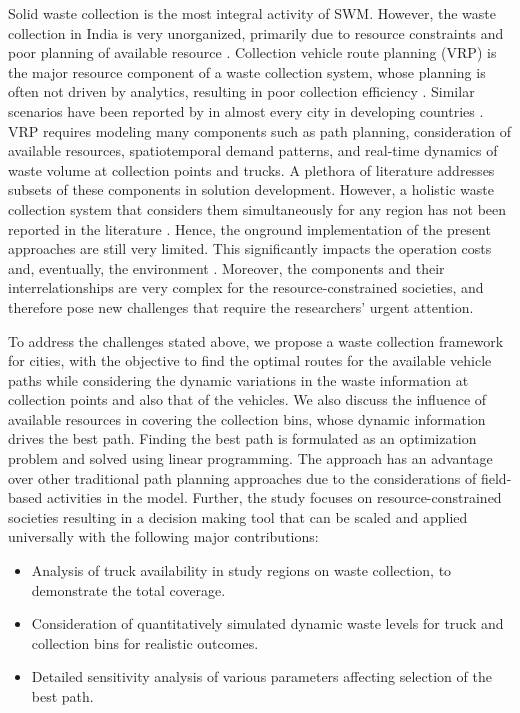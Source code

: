 \documentclass[12pt]{article}
\begin{document}
Solid waste collection is the most integral activity of SWM. However, the waste collection in India is very unorganized, primarily due to resource constraints and poor planning of available resource \cite{somani2021integrated,GUPTA2015206}. Collection vehicle route planning (VRP) is the major resource component of a waste collection system, whose planning is often not driven by analytics, resulting in poor collection efficiency \cite{akbarpour2021innovative}. Similar scenarios have been reported by in almost every city in developing countries \cite{GUPTA2015206}. VRP requires modeling many components such as path planning, consideration of available resources, spatiotemporal demand patterns, and real-time dynamics of waste volume at collection points and trucks. A plethora of literature addresses subsets of these components in solution development. However, a holistic waste collection system that considers them simultaneously for any region has not been reported in the literature \cite{han2015waste}. Hence, the onground implementation of the present approaches are still very limited. This significantly impacts the operation costs and, eventually, the environment \cite{apaydin2007route}. Moreover, the components and their interrelationships are very complex for the resource-constrained societies, and therefore pose new challenges that require the researchers' urgent attention.

To address the challenges stated above, we propose a waste collection framework for cities, with the objective to find the optimal routes for the available vehicle paths while considering the dynamic variations in the waste information at collection points and also that of the vehicles. We also discuss the influence of available resources in covering the collection bins, whose dynamic information drives the best path. Finding the best path is formulated as an optimization problem and solved using linear programming. The approach has an advantage over other traditional path planning approaches due to the considerations of field-based activities in the model. Further, the study  focuses on resource-constrained societies resulting in a decision making tool that can be scaled and applied universally with the following major contributions:

\begin{itemize}
\item Analysis of truck availability in study regions on waste collection, to demonstrate the total coverage.
\item Consideration of quantitatively simulated dynamic waste levels for truck and
collection bins for realistic outcomes.
\item Detailed sensitivity analysis of various parameters affecting selection of the best path.
\end{itemize}
\end{document}

